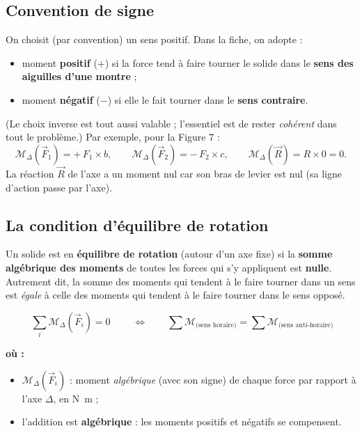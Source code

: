 \documentclass[11pt,a4paper]{article}
\newenvironment{ou}{%
  \par\smallskip\noindent\textbf{où :}\nopagebreak
  \begin{itemize}[leftmargin=1.8em,topsep=2pt,itemsep=1.5pt,parsep=0pt]}%
  {\end{itemize}}
\newcommand{\vv}[1]{\vec{#1}}
\newcommand{\Mom}{\mathcal{M}}      %
\begin{document}
\subsection{Convention de signe}
\begin{remarque}[signe du moment = sens de rotation]
On choisit (par convention) un sens positif. Dans la fiche, on adopte :
\begin{itemize}[leftmargin=1.6em,topsep=2pt,itemsep=1.5pt]
  \item moment \textbf{positif} ($+$) si la force tend à faire tourner le solide dans le
        \textbf{sens des aiguilles d'une montre} ;
  \item moment \textbf{négatif} ($-$) si elle le fait tourner dans le \textbf{sens contraire}.
\end{itemize}
(Le choix inverse est tout aussi valable ; l'essentiel est de rester \emph{cohérent} dans tout le
problème.) Par exemple, pour la Figure 7 :
\[
\Mom_{\Delta}(\vv F_1) = +\,F_1\times b, \qquad
\Mom_{\Delta}(\vv F_2) = -\,F_2\times c, \qquad
\Mom_{\Delta}(\vv R) = R\times 0 = 0 .
\]
La réaction $\vv R$ de l'axe a un moment nul car son bras de levier est nul (sa ligne d'action passe
par l'axe).
\end{remarque}

\subsection{La condition d'équilibre de rotation}
\begin{theoreme}
Un solide est en \textbf{équilibre de rotation} (autour d'un axe fixe) si la \textbf{somme algébrique
des moments} de toutes les forces qui s'y appliquent est \textbf{nulle}. Autrement dit, la somme des
moments qui tendent à le faire tourner dans un sens est \emph{égale} à celle des moments qui
tendent à le faire tourner dans le sens opposé.
\end{theoreme}

\begin{formule}
\[
\boxed{\;\sum_i \Mom_{\Delta}(\vv F_i) = 0\;}
\qquad\Longleftrightarrow\qquad
\sum \Mom_{\text{(sens horaire)}} = \sum \Mom_{\text{(sens anti-horaire)}}
\]
\begin{ou}
  \item $\Mom_{\Delta}(\vv F_i)$ : moment \emph{algébrique} (avec son signe) de chaque force par
        rapport à l'axe $\Delta$, en \si{\newton\metre} ;
  \item l'addition est \textbf{algébrique} : les moments positifs et négatifs se compensent.
\end{ou}
\end{formule}
\end{document}
